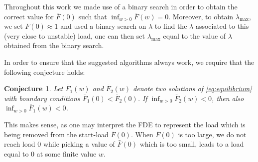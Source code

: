 \documentclass[12pt]{report}
\newtheorem{conjecture}{Conjecture}
\begin{document}
Throughout this work we made use of a binary search in order to obtain the correct value for $\bar F(0)$ such that $\inf_{w > 0} \bar F(w) = 0$. Moreover, to obtain $\lambda_{\max}$, we set $\bar F(0) \approx 1$ and used a binary search on $\lambda$ to find the $\lambda$ associated to this (very close to unstable) load, one can then set $\lambda_{\max}$ equal to the value of $\lambda$ obtained from the binary search.

In order to ensure that the suggested algorithms always work, we require that the following conjecture holds:
\begin{conjecture}
	Let $\bar F_1(w)$ and $\bar F_2(w)$ denote two solutions of \eqref{eq:equilibrium} with boundary conditions $\bar F_1(0) < \bar F_2(0)$. If $\inf_{w > 0} \bar F_2(w) < 0$, then also $\inf_{w>0}\bar F_1(w) < 0$.
\end{conjecture}
This makes sense, as one may interpret the FDE to represent the load which is being removed from the start-load $\bar F(0)$. When $\bar F(0)$ is too large, we do not reach load $0$ while picking a value of $\bar F(0)$ which is too small, leads to a load  equal to $0$ at some finite value $w$.
\end{document}
